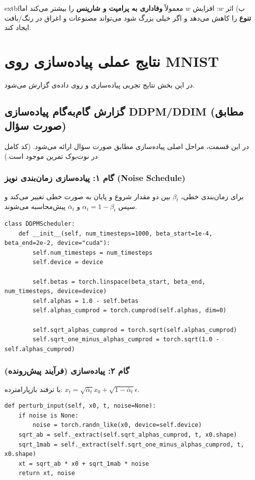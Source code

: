         extbf{ب) اثر $w$:}
افزایش $w$ معمولاً \textbf{وفاداری به پرامپت و شارپنس} را بیشتر می‌کند اما \textbf{تنوع} را کاهش می‌دهد و اگر خیلی بزرگ شود می‌تواند مصنوعات و اغراق در رنگ/بافت ایجاد کند.

\section{نتایج عملی پیاده‌سازی روی MNIST}

در این بخش نتایج تجربی پیاده‌سازی
و
روی داده‌ی
گزارش می‌شود.

\subsection{گزارش گام‌به‌گام پیاده‌سازی DDPM/DDIM (مطابق صورت سؤال)}
در این قسمت، مراحل اصلی پیاده‌سازی مطابق صورت سؤال ارائه می‌شود. (کد کامل در نوت‌بوک تمرین موجود است.)

\subsubsection*{گام ۱: پیاده‌سازی زمان‌بندی نویز (Noise Schedule)}
برای زمان‌بندی خطی، $\beta_t$ بین دو مقدار شروع و پایان به صورت خطی تغییر می‌کند و سپس $\alpha_t=1-\beta_t$ و $\bar{\alpha}_t$ پیش‌محاسبه می‌شوند.
\begin{verbatim}
class DDPMScheduler:
    def __init__(self, num_timesteps=1000, beta_start=1e-4, beta_end=2e-2, device="cuda"):
        self.num_timesteps = num_timesteps
        self.device = device

        self.betas = torch.linspace(beta_start, beta_end, num_timesteps, device=device)
        self.alphas = 1.0 - self.betas
        self.alphas_cumprod = torch.cumprod(self.alphas, dim=0)

        self.sqrt_alphas_cumprod = torch.sqrt(self.alphas_cumprod)
        self.sqrt_one_minus_alphas_cumprod = torch.sqrt(1.0 - self.alphas_cumprod)
\end{verbatim}

\subsubsection*{گام ۲: پیاده‌سازی  (فرآیند پیش‌رونده)}
با ترفند بازپارامترده:
$x_t=\sqrt{\bar{\alpha}_t}x_0+\sqrt{1-\bar{\alpha}_t}\epsilon$.
\begin{verbatim}
def perturb_input(self, x0, t, noise=None):
    if noise is None:
        noise = torch.randn_like(x0, device=self.device)
    sqrt_ab = self._extract(self.sqrt_alphas_cumprod, t, x0.shape)
    sqrt_1mab = self._extract(self.sqrt_one_minus_alphas_cumprod, t, x0.shape)
    xt = sqrt_ab * x0 + sqrt_1mab * noise
    return xt, noise
\end{verbatim}

